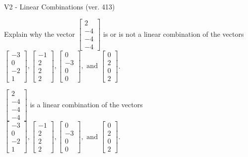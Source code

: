 \begin{exercise}
  \begin{exerciseTitle}V2 - Linear Combinations (ver. 413)\end{exerciseTitle}
  \begin{exerciseStatement}
    Explain why the vector \(\left[\begin{array}{c}
2 \\
-4 \\
-4 \\
-4
\end{array}\right]\)  is or is not a linear 
	combination of the vectors \(\left[\begin{array}{c}
-3 \\
0 \\
-2 \\
1
\end{array}\right] , \left[\begin{array}{c}
-1 \\
2 \\
2 \\
2
\end{array}\right] , \left[\begin{array}{c}
0 \\
-3 \\
0 \\
0
\end{array}\right] , \text{ and } \left[\begin{array}{c}
0 \\
2 \\
0 \\
2
\end{array}\right]\).
	


  \end{exerciseStatement}
  \begin{exerciseAnswer}
   \(\left[\begin{array}{c}
2 \\
-4 \\
-4 \\
-4
\end{array}\right]\) 
  	 is  
	a linear combination of the vectors \(\left[\begin{array}{c}
-3 \\
0 \\
-2 \\
1
\end{array}\right] , \left[\begin{array}{c}
-1 \\
2 \\
2 \\
2
\end{array}\right] , \left[\begin{array}{c}
0 \\
-3 \\
0 \\
0
\end{array}\right] , \text{ and } \left[\begin{array}{c}
0 \\
2 \\
0 \\
2
\end{array}\right]\).


\end{exerciseAnswer}
\end{exercise}

